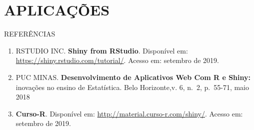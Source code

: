 \documentclass[
  ignorenonframetext,
]{beamer}
\providecommand{\tightlist}{%
  \setlength{\itemsep}{0pt}\setlength{\parskip}{0pt}}
\begin{document}
\hypertarget{aplicacoes}{%
\section{APLICAÇÕES}\label{aplicacoes}}

\begin{frame}{REFERÊNCIAS}
\protect\hypertarget{referencias}{}

\begin{enumerate}
\tightlist
\item
  RSTUDIO INC. \textbf{Shiny from RStudio}. Disponível em:
  \url{https://shiny.rstudio.com/tutorial/}. Acesso em: setembro de
  2019.
\item
  PUC MINAS. \textbf{Desenvolvimento de Aplicativos Web Com R e Shiny:}
  inovações no ensino de Estatística. Belo Horizonte,v. 6, n.~2,
  p.~55-71, maio 2018
\item
  \textbf{Curso-R}. Disponível em:
  \url{http://material.curso-r.com/shiny/}. Acesso em: setembro de 2019.
\end{enumerate}

\end{frame}
\end{document}
